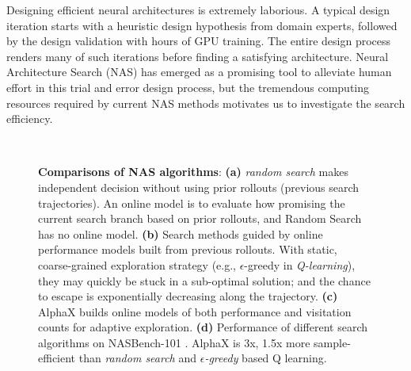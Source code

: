 \documentclass[10pt,twocolumn,letterpaper]{article}
\begin{document}
Designing efficient neural architectures is extremely laborious. A typical design iteration starts with a heuristic design hypothesis from domain experts, followed by the design validation with hours of GPU training. The entire design process renders many of such iterations before finding a satisfying architecture. Neural Architecture Search (NAS) has emerged as a promising tool to alleviate human effort in this trial and error design process, but the tremendous computing resources required by current NAS methods motivates us to investigate the search efficiency.







\iffalse 
The most successful subclass of MCTS is to a tree search policy \cite{kocsis2006bandit}.
\fi

\begin{figure}[t]
\centering 
{} \quad
{}\\
 \quad
{}
    \caption{ \textbf{Comparisons of NAS algorithms}: \textbf{(a)} \textit{random search} makes independent decision without using prior rollouts (previous search trajectories). An online model is to evaluate how promising the current search branch based on prior rollouts, and Random Search has no online model. \textbf{(b)} Search methods guided by online performance models built from previous rollouts. With static, coarse-grained exploration strategy (e.g., $\epsilon$-greedy in \textit{Q-learning}), they may quickly be stuck in a sub-optimal solution; and the chance to escape is exponentially decreasing along the trajectory.  \textbf{(c)} AlphaX builds online models of both performance and visitation counts for adaptive exploration. \textbf{(d)} Performance of different search algorithms on NASBench-101 \cite{ying2019bench}. AlphaX is 3x, 1.5x more sample-efficient than \textit{random search} and \textit{$\epsilon$-greedy} based Q learning.  }
\label{fig:teaser}
\end{figure}
\end{document}
